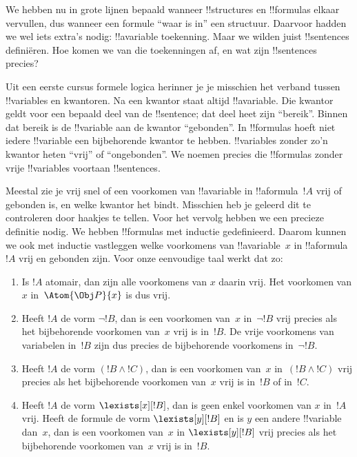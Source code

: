 \documentclass[openany]{memoir}
\begin{document}
\begingroup
\def\olfilename{OLP-0144}
\def\olfilepath{content/first-order-logic/introduction/}
\hypertarget{unit-OLP-0144}{}





We hebben nu in grote lijnen bepaald wanneer !!{structure}s en
!!{formula}s elkaar vervullen, dus wanneer een formule ``waar is in''
een structuur. Daarvoor hadden we wel iets extra's nodig: !!a{variable}
toekenning. Maar we wilden juist !!{sentence}s definiëren. Hoe komen we
van die toekenningen af, en wat zijn !!{sentence}s precies?

Uit een eerste cursus formele logica herinner je je misschien het
verband tussen !!{variable}s en kwantoren. Na een kwantor staat altijd
!!a{variable}. Die kwantor geldt voor een bepaald deel van de
!!{sentence}; dat deel heet zijn ``bereik''. Binnen dat bereik is de
!!{variable} aan de kwantor ``gebonden''. In !!{formula}s hoeft niet
iedere !!{variable} een bijbehorende kwantor te hebben. !!{variable}s
zonder zo'n kwantor heten ``vrij'' of ``ongebonden''. We noemen precies
die !!{formula}s zonder vrije !!{variable}s voortaan !!{sentence}s.

Meestal zie je vrij snel of een voorkomen van !!a{variable} in
!!a{formula}~$!A$ vrij of gebonden is, en welke kwantor het bindt.
Misschien heb je geleerd dit te controleren door haakjes te tellen.
Voor het vervolg hebben we een precieze definitie nodig. We hebben
!!{formula}s met inductie gedefinieerd. Daarom kunnen we ook met
inductie vastleggen welke voorkomens van !!a{variable}~$x$ in
!!a{formula}~$!A$ vrij en gebonden zijn. Voor onze eenvoudige taal
werkt dat zo:
\begin{enumerate}
  \item Is $!A$ atomair, dan zijn alle voorkomens van $x$ daarin vrij.
  Het voorkomen van $x$ in~$\Atom{\Obj P}{x}$ is dus vrij.
  \item Heeft $!A$ de vorm $\lnot !B$, dan is een voorkomen van~$x$
  in~$\lnot !B$ vrij precies als het bijbehorende voorkomen van~$x$
  vrij is in~$!B$. De vrije voorkomens van variabelen in~$!B$ zijn dus
  precies de bijbehorende voorkomens in~$\lnot !B$.
  \item Heeft $!A$ de vorm $(!B \land !C)$, dan is een voorkomen van~$x$
  in~$(!B \land !C)$ vrij precies als het bijbehorende voorkomen van~$x$
  vrij is in~$!B$ of in~$!C$.
  \item Heeft $!A$ de vorm $\lexists[x][!B]$, dan is geen enkel voorkomen
  van $x$ in~$!A$ vrij. Heeft de formule de vorm $\lexists[y][!B]$ en is $y$
  een andere !!{variable} dan~$x$, dan is een voorkomen van~$x$ in
  $\lexists[y][!B]$ vrij precies als het bijbehorende voorkomen van~$x$
  vrij is in~$!B$.
\end{enumerate}
\end{document}
